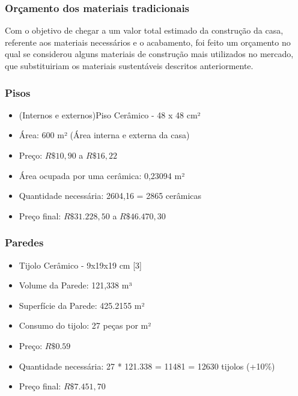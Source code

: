 \subsubsection*{\textbf{Orçamento dos materiais tradicionais}}

	Com o objetivo de chegar a um valor total estimado da construção da casa, referente aos materiais necessários e o acabamento, foi feito um orçamento no qual se considerou alguns materiais de construção mais utilizados no mercado, que substituiriam os materiais sustentáveis descritos anteriormente.


\subsubsection*{\textbf{Pisos}}

\begin{itemize}

		\item (Internos e externos)Piso Cerâmico - 48 x 48 cm²

		\item Área: 600 m² (Área interna e externa da casa)

		\item Preço: $R\$ 10,90$ a $R\$16,22$

		\item Área ocupada por uma cerâmica: 0,23094 m²

		\item Quantidade necessária: 2604,16 = 2865 cerâmicas

		\item Preço final: $R\$31.228,50$ a $R\$46.470,30$

\end{itemize}

\subsubsection*{\textbf{Paredes}}

\begin{itemize}

		\item Tijolo Cerâmico - 9x19x19 cm [3]

		\item Volume da Parede: 121,338 m³

		\item Superfície da Parede: 425.2155 m²

		\item Consumo do tijolo: 27 peças por m²

		\item Preço: $R\$ 0.59$

		\item Quantidade necessária: 27 * 121.338 = 11481 = 12630 tijolos (+10\%)

		\item Preço final: $R\$7.451,70$
\end{itemize}


